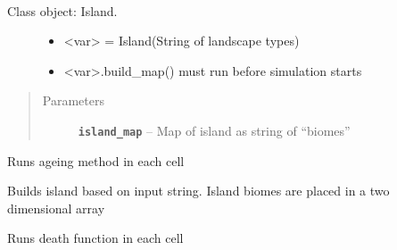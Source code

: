 \documentclass[a4paper,10pt,openany,oneside]{sphinxmanual}
\begin{document}
\begin{fulllineitems}
\label{island:biosim.island.Island}~\begin{description}
\item[{Class object: Island.}] \leavevmode\begin{itemize}
\item {} 
\textless{}var\textgreater{} = Island(String of landscape types)

\item {} 
\textless{}var\textgreater{}.build\_map() must run before simulation starts

\end{itemize}

\end{description}
\begin{quote}\begin{description}
\item[{Parameters}] \leavevmode
\textbf{\texttt{island\_map}} -- Map of island as string of ``biomes''

\end{description}\end{quote}

\begin{fulllineitems}
\label{island:biosim.island.Island.aging}
Runs ageing method in each cell

\end{fulllineitems}


\begin{fulllineitems}
\label{island:biosim.island.Island.build_map}
Builds island based on input string.
Island biomes are placed in a two dimensional array

\end{fulllineitems}


\begin{fulllineitems}
\label{island:biosim.island.Island.death}
Runs death function in each cell

\end{fulllineitems}


\end{fulllineitems}
\end{document}
